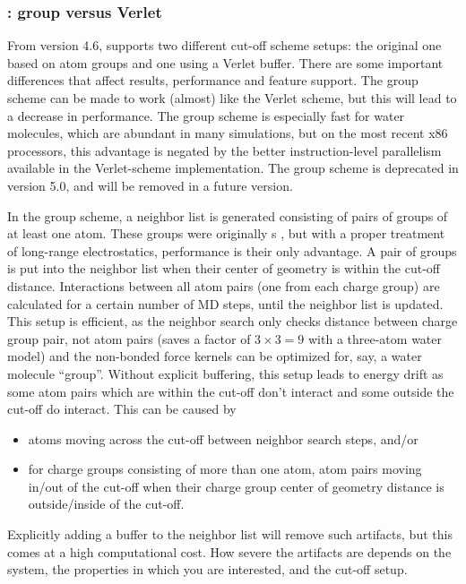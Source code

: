 \subsubsection{: group versus Verlet}
From version 4.6, {\gromacs} supports two different cut-off scheme
setups: the original one based on atom groups and one using a Verlet
buffer. There are some important differences that affect results,
performance and feature support. The group scheme can be made to work
(almost) like the Verlet scheme, but this will lead to a decrease in
performance. The group scheme is especially fast for water molecules,
which are abundant in many simulations, but on the most recent x86
processors, this advantage is negated by the better instruction-level
parallelism available in the Verlet-scheme implementation. The group
scheme is deprecated in version 5.0, and will be removed in a future
version.

In the group scheme, a neighbor list is generated consisting of pairs
of groups of at least one atom. These groups were originally
s , but with a proper treatment of long-range
electrostatics, performance is their only advantage. A pair of groups
is put into the neighbor list when their center of geometry is within
the cut-off distance. Interactions between all atom pairs (one from
each charge group) are calculated for a certain number of MD steps,
until the neighbor list is updated. This setup is efficient, as the
neighbor search only checks distance between charge group pair, not
atom pairs (saves a factor of $3 \times 3 = 9$ with a three-atom water
model) and the non-bonded force kernels can be optimized for, say, a
water molecule ``group''. Without explicit buffering, this setup leads
to energy drift as some atom pairs which are within the cut-off don't
interact and some outside the cut-off do interact. This can be caused
by
\begin{itemize}
\item atoms moving across the cut-off between neighbor search steps, and/or
\item for charge groups consisting of more than one atom, atom pairs
  moving in/out of the cut-off when their charge group center of
  geometry distance is outside/inside of the cut-off.
\end{itemize}
Explicitly adding a buffer to the neighbor list will remove such
artifacts, but this comes at a high computational cost. How severe the
artifacts are depends on the system, the properties in which you are
interested, and the cut-off setup.

